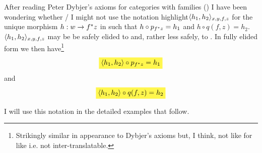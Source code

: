 After reading Peter Dybjer's axioms for categories with families (\cite{}) I have been wondering whether / I might not use the notation highlight{$\langle h_1,h_2\rangle_{x,y,f,z}$}  for the unique morphism   
$h:w \rightarrow f ^* z$ in  such that
$h \circ p_{f ^* z} = h_1$ and $h \circ q(f,z) = h_2$.\\

$\langle h_1,h_2\rangle_{x,y,f,z}$ may be be safely elided to  and, rather less safely, to .
In fully elided form we then  have\footnote{Strikingly similar in appearance to Dybjer's axioms but, I think, not like for like i.e. not inter-translatable.} 
\begin{equation}
\mbox{\highlight{$\tuple{h_1,h_2} \circ p_{f^*z} = h_1$}}
\end{equation}
and
\begin{equation}
\mbox{\highlight{$\tuple{h_1,h_2} \circ q(f,z) = h_2$}}
\end{equation}

I will use this notation in the detailed examples that follow.

